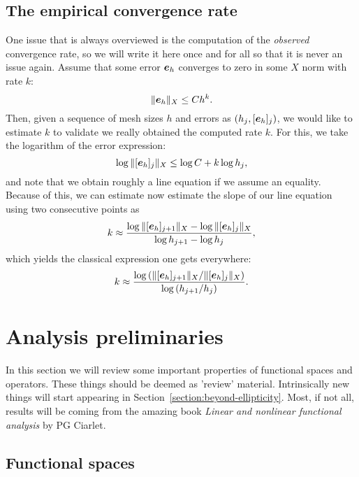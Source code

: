 \documentclass{article}
\renewcommand{\vec}{\vectorsym}
\begin{document}
\subsection{The empirical convergence rate}
One issue that is always overviewed is the computation of the \emph{observed} convergence rate, so we will write it here once and for all so that it is never an issue again. Assume that some error $\vec e_h$ converges to zero in some $X$ norm with rate $k$:
    $$ \|\vec e_h\|_X \leq C h^k.$$
    Then, given a sequence of mesh sizes $h$ and errors as $(h_j, [\vec e_h]_j)$, we would like to estimate $k$ to validate we really obtained the computed rate $k$. For this, we take the logarithm of the error expression:
    $$ \log \|[\vec e_h]_j\|_X \leq \log C + k \log h_j, $$
and note that we obtain roughly a line equation if we assume an equality. Because of this, we can estimate now estimate the slope of our line equation using two consecutive points as
$$ k \approx \frac{\log \|[\vec e_h]_{j+1}\|_X - \log \|[\vec e_h]_j\|_X}{ \log h_{j+1} - \log h_j}, $$
which yields the classical expression one gets everywhere: 
    $$ k \approx  \frac{\log \left(\|[\vec e_h]_{j+1}\|_X / \|[\vec e_h]_j\|_X\right)}{ \log \left(h_{j+1} / h_j\right)}. $$

\section{Analysis preliminaries}
In this section we will review some important properties of functional spaces and operators. These things should be deemed as 'review' material. Intrinsically new things will start appearing in Section~\ref{section:beyond-ellipticity}. Most, if not all, results will be coming from the amazing book \emph{Linear and nonlinear functional analysis} by PG Ciarlet.

\subsection{Functional spaces}
\end{document}
